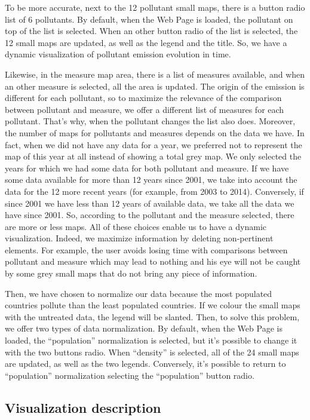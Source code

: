 \documentclass[preprint,journal]{vgtc}       %
\begin{document}
To be more accurate, next to the 12 pollutant small maps, there is a button radio list of 6 pollutants. By default, when the Web Page is loaded, the pollutant on top of the list is selected. When an other button radio of the list is selected, the 12 small maps are updated, as well as the legend and the title. So, we have a dynamic visualization of pollutant emission evolution in time.

Likewise, in the measure map area, there is a list of measures available, and when an other measure is selected, all the area is updated. The origin of the emission is different for each pollutant, so to maximize the relevance of the comparison between pollutant and measure, we offer a different list of measures for each pollutant. That’s why, when the pollutant changes the list also does. 
Moreover, the number of maps for pollutants and measures depends on the data we have. In fact, when we did not have any data for a year, we preferred not to represent the map of this year at all instead of showing a total grey map. We only selected the years for which we had some data for both pollutant and measure. If we have some data available for more than 12 years since 2001, we take into account the data for the 12 more recent years (for example, from 2003 to 2014). Conversely, if since 2001 we have less than 12 years of available data, we take all the data we have since 2001. So, according to the pollutant and the measure selected, there are more or less maps.
All of these choices enable us to have a dynamic visualization. Indeed, we maximize information by deleting non-pertinent elements. For example, the user avoids losing time with comparisons between pollutant and measure which may lead to nothing and his eye will not be caught by some grey small maps that do not bring any piece of information.

Then, we have chosen to normalize our data because the most populated countries pollute than the least populated countries. If we colour the small maps with the untreated data, the legend will be slanted. Then, to solve this problem, we offer two types of data normalization. By default, when the Web Page is loaded, the “population” normalization is selected, but it’s possible to change it with the two buttons radio. When “density” is selected, all of the 24 small maps are updated, as well as the two legends. Conversely, it’s possible to return to “population” normalization selecting the “population” button radio. 
	\subsection{Visualization description}
	
\end{document}
